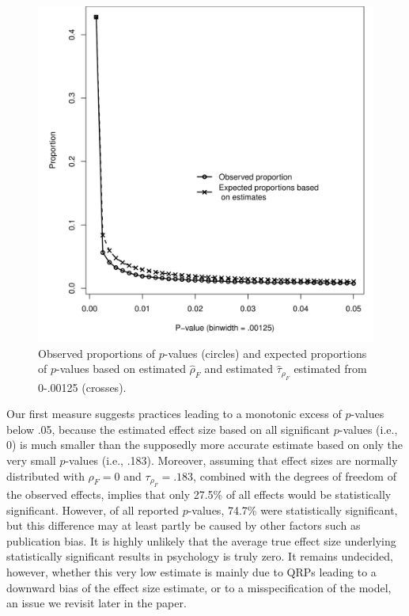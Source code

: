 \documentclass[a5paper]{book}
\begin{document}
\begin{figure}[h]

{\centering \includegraphics[width=0.8\linewidth]{assets/figures/bump-fig5} 

}

\caption{Observed proportions of $p$-values (circles) and expected proportions of $p$-values based on estimated $\hat{\rho}_F$ and estimated $\hat{\tau}_{\rho_F}$ estimated from 0-.00125 (crosses).}\label{fig:bump-fig5}
\end{figure}

Our first measure suggests practices leading to a monotonic excess of
\(p\)-values below .05, because the estimated effect size based on all
significant \(p\)-values (i.e., 0) is much smaller than the supposedly
more accurate estimate based on only the very small \(p\)-values (i.e.,
.183). Moreover, assuming that effect sizes are normally distributed
with \(\rho_F=0\) and \(\tau_{\rho_F}=.183\), combined with the degrees
of freedom of the observed effects, implies that only 27.5\% of all
effects would be statistically significant. However, of all reported
\(p\)-values, 74.7\% were statistically significant, but this difference
may at least partly be caused by other factors such as publication bias.
It is highly unlikely that the average true effect size underlying
statistically significant results in psychology is truly zero. It
remains undecided, however, whether this very low estimate is mainly due
to QRPs leading to a downward bias of the effect size estimate, or to a
misspecification of the model, an issue we revisit later in the paper.
\end{document}
